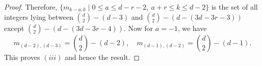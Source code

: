 \documentclass[preprint,sort&compress,12pt]{elsarticle}
\newtheorem{theorem}{Theorem}[section]
\numberwithin{equation}{section}
\theoremstyle{definition}
\newcommand{\Z}{\mathbb{Z}}
\begin{document}
\begin{proof}
Therefore, ${\{m_{k-a,k} \mid 0\leq a \leq d-r-2,\ a+r \leq k \leq d-2\}}$ is the set of all integers lying between $\binom{d}{2}-(d-3)$ and 
 $\binom{d}{2}-(d-(3d-3r-3))$ except $\binom{d}{2}-(d-(3d-3r-4))$.
 Now for $a=-1$, we have
 $$m_{(d-2),(d-3)}=\binom{d}{2}-(d-2),\quad m_{(d-1),(d-2)}=\binom{d}{2}-(d-1).$$ 
This proves $(iii)$ and hence the result.
\end{proof} 
\end{document}
